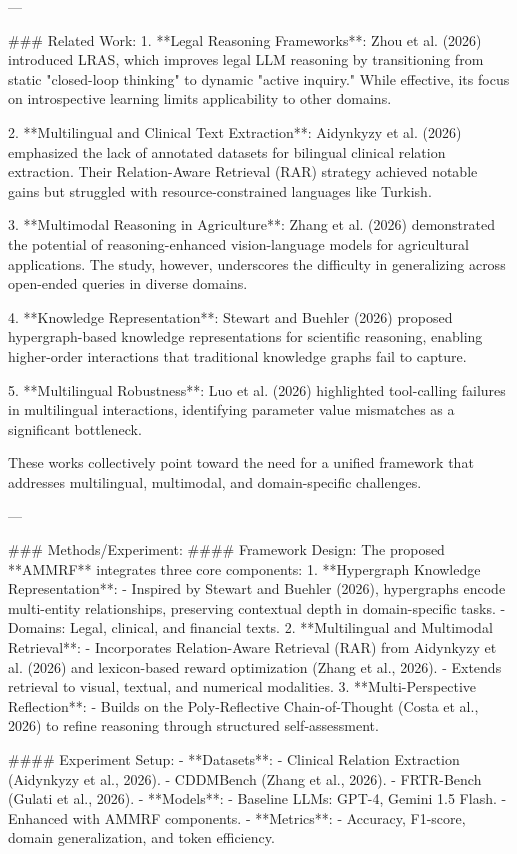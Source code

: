 ---

### Related Work:
1. **Legal Reasoning Frameworks**: Zhou et al. (2026) introduced LRAS, which improves legal LLM reasoning by transitioning from static "closed-loop thinking" to dynamic "active inquiry." While effective, its focus on introspective learning limits applicability to other domains.

2. **Multilingual and Clinical Text Extraction**: Aidynkyzy et al. (2026) emphasized the lack of annotated datasets for bilingual clinical relation extraction. Their Relation-Aware Retrieval (RAR) strategy achieved notable gains but struggled with resource-constrained languages like Turkish.

3. **Multimodal Reasoning in Agriculture**: Zhang et al. (2026) demonstrated the potential of reasoning-enhanced vision-language models for agricultural applications. The study, however, underscores the difficulty in generalizing across open-ended queries in diverse domains.

4. **Knowledge Representation**: Stewart and Buehler (2026) proposed hypergraph-based knowledge representations for scientific reasoning, enabling higher-order interactions that traditional knowledge graphs fail to capture.

5. **Multilingual Robustness**: Luo et al. (2026) highlighted tool-calling failures in multilingual interactions, identifying parameter value mismatches as a significant bottleneck.

These works collectively point toward the need for a unified framework that addresses multilingual, multimodal, and domain-specific challenges.

---

### Methods/Experiment:
#### Framework Design:
The proposed **AMMRF** integrates three core components:
1. **Hypergraph Knowledge Representation**:
   - Inspired by Stewart and Buehler (2026), hypergraphs encode multi-entity relationships, preserving contextual depth in domain-specific tasks.
   - Domains: Legal, clinical, and financial texts.
2. **Multilingual and Multimodal Retrieval**:
   - Incorporates Relation-Aware Retrieval (RAR) from Aidynkyzy et al. (2026) and lexicon-based reward optimization (Zhang et al., 2026).
   - Extends retrieval to visual, textual, and numerical modalities.
3. **Multi-Perspective Reflection**:
   - Builds on the Poly-Reflective Chain-of-Thought (Costa et al., 2026) to refine reasoning through structured self-assessment.

#### Experiment Setup:
- **Datasets**: 
  - Clinical Relation Extraction (Aidynkyzy et al., 2026).
  - CDDMBench (Zhang et al., 2026).
  - FRTR-Bench (Gulati et al., 2026).
- **Models**:
  - Baseline LLMs: GPT-4, Gemini 1.5 Flash.
  - Enhanced with AMMRF components.
- **Metrics**:
  - Accuracy, F1-score, domain generalization, and token efficiency.

